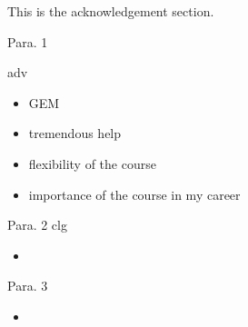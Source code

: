 This is the acknowledgement section.

Para. 1

adv
\begin{itemize}
    \item GEM 
    \item tremendous help
    \item flexibility of the course
    \item importance of the course in my career
\end{itemize}


Para. 2 
clg
\begin{itemize}
    \item 
\end{itemize}

Para. 3
\begin{itemize}
    \item 
\end{itemize}